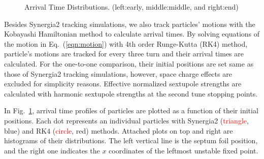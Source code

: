 \documentclass[aps,prstab,onecolumn,preprint]{revtex4-1}
\begin{document}
\begin{figure}[!tbp]
  \caption{\label{fig:arrival2}Arrival Time Distributions. (left:early, middle:middle, and right:end)}
\end{figure}

Besides Synergia2 tracking simulations, we also track particles' motions with the Kobayashi Hamiltonian method to calculate arrival times. By solving equations of the motion in Eq.~(\ref{eqn:motion}) with 4th order Runge-Kutta (RK4) method, particle's motions are tracked for every three turn and their arrival times are calculated. For the one-to-one comparison, their initial positions are set same as those of Synergia2 tracking simulations, however, space charge effects are excluded for simplicity reasons. Effective normalized sextupole strengths are calculated with harmonic sextupole strengths at the second tune stopping points.

In Fig.~\ref{fig:arrival2}, arrival time profiles of particles are plotted as a function of their initial positions. Each dot represents an individual particles with Synergia2 (\textcolor{red}{triangle}, blue) and RK4 (\textcolor{red}{circle}, red) methods. Attached plots on top and right are histograms of their distributions. The left vertical line is the septum foil position, and the right one indicates the $x$ coordinates of the leftmost unstable fixed point. 
\end{document}
